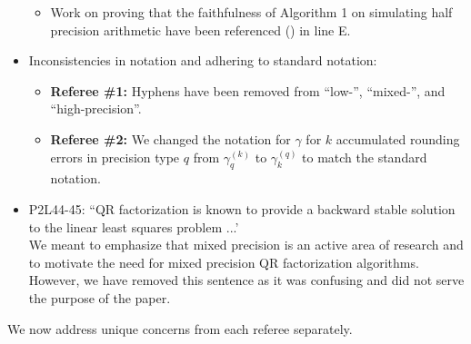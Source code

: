 \documentclass[10pt]{article}
\begin{document}
\begin{itemize}
\begin{itemize}
    	\item Work on proving that the faithfulness of Algorithm 1 on simulating half precision arithmetic have been referenced (\cite{HighamPranesh2019b}) in line E. 
    \end{itemize}
	\item Inconsistencies in notation and adhering to standard notation:
	\begin{itemize}\normalfont
		\item \textbf{Referee \#1: }Hyphens have been removed from ``low-'', ``mixed-'', and ``high-precision''.
		\item \textbf{Referee \#2: }We changed the notation for $\gamma$ for $k$ accumulated rounding errors in precision type $q$ from $\gamma_{q}^{(k)}$ to $\gamma_{k}^{(q)}$ to match the standard notation.
	\end{itemize}
	\item P2L44-45: ``QR factorization is known to provide a backward stable solution to the linear least squares problem ...' \\
	{\normalfont
	We meant to emphasize that mixed precision is an active area of research and to motivate the need for mixed precision QR factorization algorithms.
	However, we have removed this sentence as it was confusing and did not serve the purpose of the paper.
	}
\end{itemize}

We now address unique concerns from each referee separately.
\end{document}
